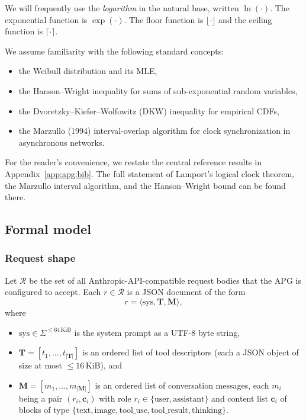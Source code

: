 We will frequently use the \emph{logarithm} in the natural base,
written $\ln(\cdot)$. The exponential function is $\exp(\cdot)$.
The floor function is $\lfloor \cdot \rfloor$ and the ceiling
function is $\lceil \cdot \rceil$.

We assume familiarity with the following standard concepts:
\begin{itemize}
  \item the Weibull distribution and its MLE,
  \item the Hanson--Wright inequality for sums of
        sub-exponential random variables,
  \item the Dvoretzky--Kiefer--Wolfowitz (DKW) inequality for
        empirical CDFs,
  \item the Marzullo (1994) interval-overlap algorithm for
        clock synchronization in asynchronous networks.
\end{itemize}

For the reader's convenience, we restate the central reference
results in Appendix~\ref{app:apg:bib}. The full statement of
Lamport's logical clock theorem, the Marzullo interval algorithm,
and the Hanson--Wright bound can be found there.

\subsection{Formal model}
\label{app:apg:model}

\subsubsection{Request shape}

Let $\mathcal{R}$ be the set of all Anthropic-API-compatible request
bodies that the APG is configured to accept. Each $r \in \mathcal{R}$
is a JSON document of the form
\[
  r = \langle \mathrm{sys}, \mathbf{T}, \mathbf{M} \rangle,
\]
where
\begin{itemize}
  \item $\mathrm{sys} \in \Sigma^{\le 64\,\mathrm{KiB}}$ is the system
        prompt as a UTF-8 byte string,
  \item $\mathbf{T} = [t_1, \ldots, t_{|\mathbf{T}|}]$ is an ordered
        list of tool descriptors (each a JSON object of size at most
        $\le 16\,\mathrm{KiB}$), and
  \item $\mathbf{M} = [m_1, \ldots, m_{|\mathbf{M}|}]$ is an ordered
        list of conversation messages, each $m_i$ being a pair
        $(r_i, \mathbf{c}_i)$ with role $r_i \in \{\mathrm{user},
        \mathrm{assistant}\}$ and content list $\mathbf{c}_i$ of
        blocks of type
        $\{\mathrm{text}, \mathrm{image}, \mathrm{tool\_use},
        \mathrm{tool\_result}, \mathrm{thinking}\}$.
\end{itemize}

